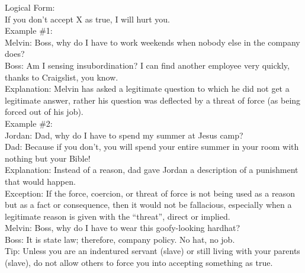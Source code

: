 \documentclass[a4paper,12pt,single,pdftex]{scrbook}
\begin{document}
    
      Logical Form:
    \\

    
      If you don’t accept X as true, I will hurt you.
    \\

    
      Example \#1:
    \\

    
      Melvin: Boss, why do I have to work weekends when nobody else in the company does?
    \\

    
      Boss: Am I sensing insubordination?  I can find another employee very quickly, thanks to Craigslist, you know.
    \\

    
      Explanation: Melvin has asked a legitimate question to which he did not get a legitimate answer, rather his question was deflected by a threat of force (as being forced out of his job).
    \\

    
      Example \#2:
    \\

    
      Jordan: Dad, why do I have to spend my summer at Jesus camp?
    \\

    
      Dad: Because if you don’t, you will spend your entire summer in your room with nothing but your Bible!
    \\

    
      Explanation: Instead of a reason, dad gave Jordan a description of a punishment that would happen.
    \\

    
      Exception:  If the force, coercion, or threat of force is not being used as a reason but as a fact or consequence, then it would not be fallacious, especially when a legitimate reason is given with the “threat”, direct or implied. 
    \\

    
      Melvin: Boss, why do I have to wear this goofy-looking hardhat?
    \\

    
      Boss: It is state law; therefore, company policy.  No hat, no job.
    \\

    
      Tip: Unless you are an indentured servant (slave) or still living with your parents (slave), do not allow others to force you into accepting something as true.
    \\
\end{document}
